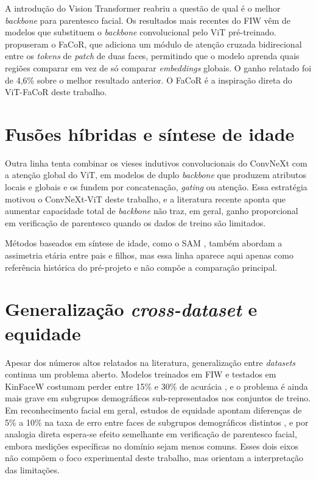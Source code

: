 A introdução do Vision Transformer \cite{dosovitskiy2020image}
reabriu a questão de qual é o melhor \textit{backbone} para parentesco facial. Os resultados mais recentes do FIW vêm de modelos que substituem o \textit{backbone} convolucional pelo ViT pré-treinado. 
propuseram o FaCoR, que adiciona um módulo de atenção cruzada bidirecional entre os \textit{tokens} de \textit{patch} de duas faces, permitindo que o modelo aprenda quais regiões comparar em vez de só comparar \textit{embeddings} globais. O ganho relatado foi de 4,6\% sobre o melhor resultado anterior. O FaCoR é a inspiração direta do ViT-FaCoR deste trabalho.

\section{Fusões híbridas e síntese de idade}

Outra linha tenta combinar os vieses indutivos convolucionais do ConvNeXt \cite{liu2022convnet}
com a atenção global do ViT, em modelos de duplo \textit{backbone} que produzem atributos locais e globais e os fundem por concatenação, \textit{gating} ou atenção. Essa estratégia motivou o ConvNeXt-ViT deste trabalho, e a literatura recente aponta que aumentar capacidade total de \textit{backbone} não traz, em geral, ganho proporcional em verificação de parentesco quando os dados de treino são limitados.

Métodos baseados em síntese de idade, como o SAM \cite{alaluf2022sam}, também abordam a assimetria etária entre pais e filhos, mas essa linha aparece aqui apenas como referência histórica do pré-projeto e não compõe a comparação principal.

\section{Generalização \textit{cross-dataset} e equidade}

Apesar dos números altos relatados na literatura, generalização entre \textit{datasets} continua um problema aberto. Modelos treinados em FIW e testados em KinFaceW costumam perder entre 15\% e 30\% de acurácia \cite{robinson2022survey}, e o problema é ainda mais grave em subgrupos demográficos sub-representados nos conjuntos de treino. Em reconhecimento facial em geral, estudos de equidade apontam diferenças de 5\% a 10\% na taxa de erro entre faces de subgrupos demográficos distintos \cite{buolamwini2018gender}, e por analogia direta espera-se efeito semelhante em verificação de parentesco facial, embora medições específicas no domínio sejam menos comuns.
Esses dois eixos não compõem o foco experimental deste trabalho, mas orientam a interpretação das limitações.

